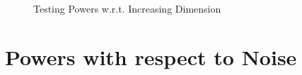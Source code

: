 \documentclass[review]{elsarticle}
\begin{document}
\begin{figure}[htbp]
{}
\hfil
{}
\caption{Testing Powers w.r.t. Increasing Dimension}
\label{}
\end{figure}

\section{Powers with respect to Noise}
\end{document}

